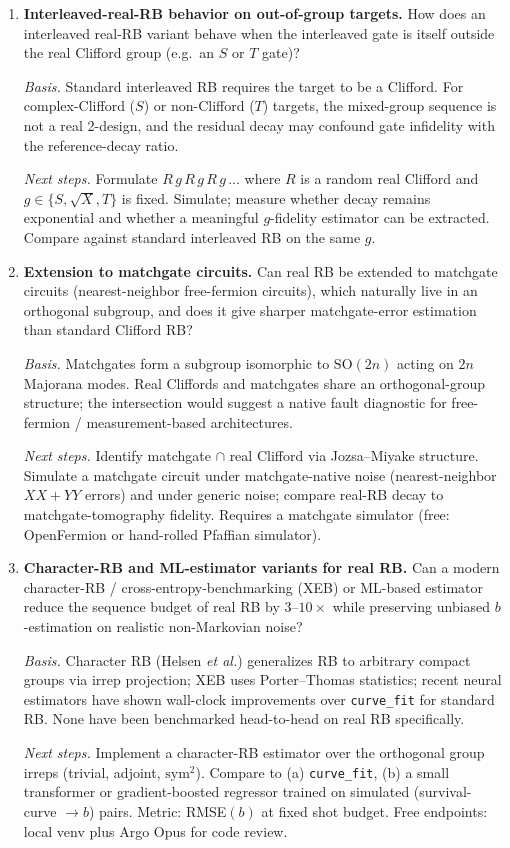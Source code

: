 \begin{enumerate}
\item \textbf{Interleaved-real-RB behavior on out-of-group targets.} How
does an interleaved real-RB variant behave when the interleaved gate is
itself outside the real Clifford group (e.g.\ an $S$ or $T$ gate)?

\emph{Basis.} Standard interleaved RB requires the target to be a Clifford.
For complex-Clifford ($S$) or non-Clifford ($T$) targets, the mixed-group
sequence is not a real 2-design, and the residual decay may confound gate
infidelity with the reference-decay ratio.

\emph{Next steps.} Formulate $R\, g\, R\, g\, R\, g\, \dots$ where $R$ is a
random real Clifford and $g \in \{S, \sqrt{X}, T\}$ is fixed. Simulate;
measure whether decay remains exponential and whether a meaningful
$g$-fidelity estimator can be extracted. Compare against standard
interleaved RB on the same $g$.

\item \textbf{Extension to matchgate circuits.} Can real RB be extended to
matchgate circuits (nearest-neighbor free-fermion circuits), which naturally
live in an orthogonal subgroup, and does it give sharper matchgate-error
estimation than standard Clifford RB?

\emph{Basis.} Matchgates form a subgroup isomorphic to $\mathrm{SO}(2n)$
acting on $2n$ Majorana modes. Real Cliffords and matchgates share an
orthogonal-group structure; the intersection would suggest a native fault
diagnostic for free-fermion / measurement-based architectures.

\emph{Next steps.} Identify matchgate $\cap$ real Clifford via
Jozsa--Miyake structure. Simulate a matchgate circuit under matchgate-native
noise (nearest-neighbor $XX + YY$ errors) and under generic noise; compare
real-RB decay to matchgate-tomography fidelity. Requires a matchgate
simulator (free: OpenFermion or hand-rolled Pfaffian simulator).

\item \textbf{Character-RB and ML-estimator variants for real RB.} Can a
modern character-RB / cross-entropy-benchmarking (XEB) or ML-based
estimator reduce the sequence budget of real RB by $3$--$10\times$ while
preserving unbiased $b$-estimation on realistic non-Markovian noise?

\emph{Basis.} Character RB (Helsen \emph{et al.}) generalizes RB to
arbitrary compact groups via irrep projection; XEB uses Porter--Thomas
statistics; recent neural estimators have shown wall-clock improvements
over \texttt{curve\_fit} for standard RB. None have been benchmarked
head-to-head on real RB specifically.

\emph{Next steps.} Implement a character-RB estimator over the orthogonal
group irreps (trivial, adjoint, $\mathrm{sym}^2$). Compare to (a)
\texttt{curve\_fit}, (b) a small transformer or gradient-boosted regressor
trained on simulated (survival-curve $\to b$) pairs. Metric: RMSE$(b)$ at
fixed shot budget. Free endpoints: local venv plus Argo Opus for code
review.

\end{enumerate}
